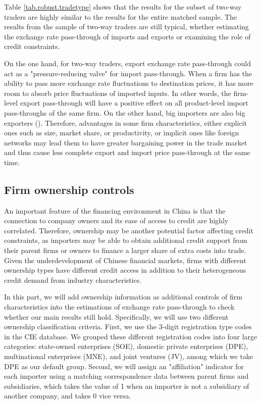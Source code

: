 \documentclass[12pt]{article}
\begin{document}
Table \ref{tab.robust.tradetype} shows that the results for the subset of two-way traders are highly similar to the results for the entire matched sample. The results from the sample of two-way traders are still typical, whether estimating the exchange rate pass-through of imports and exports or examining the role of credit constraints.

On the one hand, for two-way traders, export exchange rate pass-through could act as a "pressure-reducing valve" for import pass-through. When a firm has the ability to pass more exchange rate fluctuations to destination prices, it has more room to absorb price fluctuations of imported inputs. In other words, the firm-level export pass-through will have a positive effect on all product-level import pass-throughs of the same firm. On the other hand, big importers are also big exporters (\cite{aik2014}). Therefore, advantages in some firm characteristics, either explicit ones such as size, market share, or productivity, or implicit ones like foreign networks may lead them to have greater bargaining power in the trade market and thus cause less complete export and import price pass-through at the same time.

\subsection{Firm ownership controls}

An important feature of the financing environment in China is that the connection to company owners and its ease of access to credit are highly correlated. Therefore, ownership may be another potential factor affecting credit constraints, as importers may be able to obtain additional credit support from their parent firms or owners to finance a larger share of extra costs into trade. Given the underdevelopment of Chinese financial markets, firms with different ownership types have different credit access in addition to their heterogeneous credit demand from industry characteristics. 

In this part, we will add ownership information as additional controls of firm characteristics into the estimations of exchange rate pass-through to check whether our main results still hold. Specifically, we will use two different ownership classification criteria. First, we use the 3-digit registration type codes in the CIE database. We grouped these different registration codes into four large categories: state-owned enterprises (SOE), domestic private enterprises (DPE), multinational enterprises (MNE), and joint ventures (JV), among which we take DPE as our default group. Second, we will assign an "affiliation" indicator for each importer using a matching correspondence data between parent firms and subsidiaries, which takes the value of 1 when an importer is not a subsidiary of another company, and takes 0 vice versa.
\end{document}
